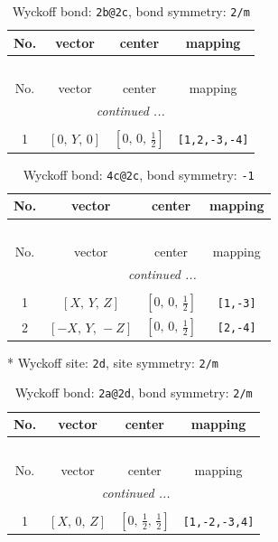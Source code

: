 \documentclass[fleqn,8pt]{jsarticle}
\begin{document}
\begin{longtable}{cccc}
\caption{Wyckoff bond: {\tt 2b@2c}, bond symmetry: {\tt 2/m}}
 \\
 \hline \hline
No. & vector & center & mapping \\ \hline \endfirsthead

\multicolumn{3}{l}{\tablename\ \thetable{}} \\
 \hline \hline
No. & vector & center & mapping \\ \hline \endhead

 \hline \hline
\multicolumn{3}{r}{\footnotesize\it continued ...} \\ \endfoot

 \hline \hline
\multicolumn{3}{r}{} \\ \endlastfoot

1 & $\left[ 0,\, Y,\, 0 \right]$ & $\left[ 0,\, 0,\, \frac{1}{2} \right]$ & {\tt [1,2,-3,-4]} \\
\end{longtable}
\renewcommand{\arraystretch}{1.2}
\begin{longtable}{cccc}
\caption{Wyckoff bond: {\tt 4c@2c}, bond symmetry: {\tt -1}}
 \\
 \hline \hline
No. & vector & center & mapping \\ \hline \endfirsthead

\multicolumn{3}{l}{\tablename\ \thetable{}} \\
 \hline \hline
No. & vector & center & mapping \\ \hline \endhead

 \hline \hline
\multicolumn{3}{r}{\footnotesize\it continued ...} \\ \endfoot

 \hline \hline
\multicolumn{3}{r}{} \\ \endlastfoot

1 & $\left[ X,\, Y,\, Z \right]$ & $\left[ 0,\, 0,\, \frac{1}{2} \right]$ & {\tt [1,-3]} \\ \hline
2 & $\left[ - X,\, Y,\, - Z \right]$ & $\left[ 0,\, 0,\, \frac{1}{2} \right]$ & {\tt [2,-4]} \\
\end{longtable}
* Wyckoff site: {\tt 2d}, site symmetry: {\tt 2/m}
\renewcommand{\arraystretch}{1.2}
\begin{longtable}{cccc}
\caption{Wyckoff bond: {\tt 2a@2d}, bond symmetry: {\tt 2/m}}
 \\
 \hline \hline
No. & vector & center & mapping \\ \hline \endfirsthead

\multicolumn{3}{l}{\tablename\ \thetable{}} \\
 \hline \hline
No. & vector & center & mapping \\ \hline \endhead

 \hline \hline
\multicolumn{3}{r}{\footnotesize\it continued ...} \\ \endfoot

 \hline \hline
\multicolumn{3}{r}{} \\ \endlastfoot

1 & $\left[ X,\, 0,\, Z \right]$ & $\left[ 0,\, \frac{1}{2},\, \frac{1}{2} \right]$ & {\tt [1,-2,-3,4]} \\
\end{longtable}
\end{document}
